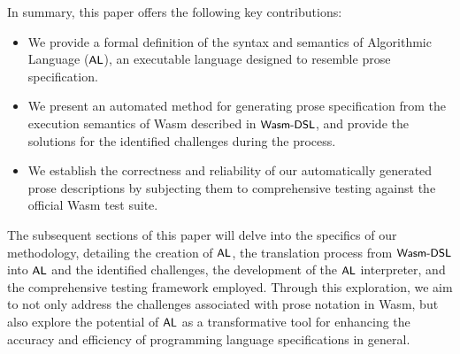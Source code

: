 In summary, this paper offers the following key contributions:

\begin{itemize}
\item We provide a formal definition of the syntax and semantics of
Algorithmic Language ($\textsf{\small AL}$), an executable language designed to resemble prose
specification.
\item We present an automated method for generating prose specification from
the execution semantics of Wasm described in $\textsf{\small Wasm-DSL}$, and provide the solutions for
the identified challenges during the process.
\item We establish the correctness and reliability of our automatically
generated prose descriptions by subjecting them to comprehensive testing
against the official Wasm test suite.
\end{itemize}

The subsequent sections of this paper will delve into the specifics of our
methodology, detailing the creation of $\textsf{\small AL}$, the translation process from
$\textsf{\small Wasm-DSL}$ into $\textsf{\small AL}$ and the identified challenges, the development of the $\textsf{\small AL}$
interpreter, and the comprehensive testing framework employed. Through this
exploration, we aim to not only address the challenges associated with prose
notation in Wasm, but also explore the potential of $\textsf{\small AL}$ as a transformative
tool for enhancing the accuracy and efficiency of programming language
specifications in general.
